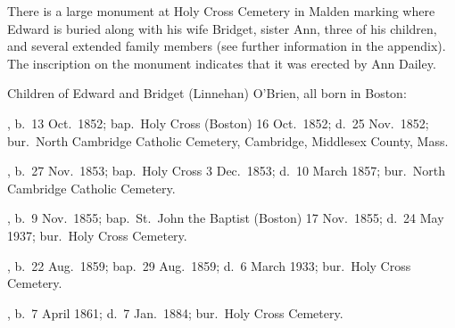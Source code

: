 There is a large monument at Holy Cross Cemetery in Malden marking where Edward is buried along with his wife Bridget, sister Ann, three of his children, and several extended family members (see further information in the appendix).\cite{Edward2OBrienGrave} The inscription on the monument indicates that it was erected by Ann Dailey.\cite{AnnDaileyMonument}

\begin{KidsIntro}
	Children of Edward and Bridget (Linnehan) O'Brien, all born in Boston:
\end{KidsIntro}

\begin{Kids}
	, b.\ 13 Oct.\ 1852;\cite{MaryAnn3OBrienBirth:2} bap.\ Holy Cross (Boston) 16 Oct.\ 1852;\cite{MaryAnn3OBrienBaptism} d.\ 25 Nov.\ 1852;\cite{MaryAnn3OBrienDeath} bur.\ North Cambridge Catholic Cemetery, Cambridge, Middlesex County, Mass.\cite{DianaBerberenaLetter1:2}
	
	, b.\ 27 Nov.\ 1853;\cite{Ellen3OBrienBirth} bap.\ Holy Cross 3 Dec.\ 1853;\cite{Ellen3OBrienBaptism} d.\ 10 March 1857;\cite{Ellen3OBrienDeath} bur.\ North Cambridge Catholic Cemetery.\cite{DianaBerberenaLetter2:1}
	
	, b.\ 9 Nov.\ 1855;\cite{AnnMaria3OBrienBirth} bap.\ St.\ John the Baptist (Boston) 17 Nov.\ 1855;\cite{AnnMaria3OBrienBaptism} d.\ 24 May 1937;\cite{AnnMaria3OBrienDeath:2} bur.\ Holy Cross Cemetery.\cite{CarolGordon:5}
	
	, b.\ 22 Aug.\ 1859;\cite{Margaret3OBrien2Baptism:1} bap.\ 29 Aug.\ 1859;\cite{Margaret3OBrien2Baptism:2} d.\ 6 March 1933;\cite{Margaret3OBrien2Death:2} bur.\ Holy Cross Cemetery.\cite{CarolGordon:6}
	
	, b.\ 7 April 1861;\cite{Edward3OBrienBirth:2} d.\ 7 Jan.\ 1884;\cite{Edward3OBrienDeath} bur.\ Holy Cross Cemetery.\cite{CarolGordon:7}
\end{Kids}